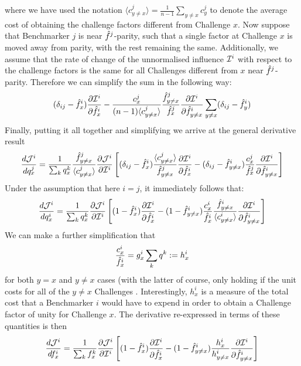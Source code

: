 where we have used the notation $\langle c^j_{y \neq x}\rangle = \frac{1}{n-1} \sum_{y \neq x} c^j_y$ to denote the average cost of obtaining the challenge factors different from Challenge $x$. 
Now suppose that Benchmarker $j$ is near $\hat{f}^j$-parity, such that a single factor at Challenge $x$ is moved away from parity, with the rest remaining the same. 
Additionally, we assume that the rate of change of the unnormalised influence $\mathcal{I}^i$ with respect to the challenge factors is the same for all Challenges different from $x$ near $\hat{f}^j$-parity.
Therefore we can simplify the sum in the following way:
\begin{equation}
	(\delta_{ij} - \hat{f}^i_x)\frac{\partial \mathcal{I}^i}{\partial \hat{f}^i_x} - \frac{c^j_x}{(n-1) \langle c^j_{y \neq x}\rangle} \frac{\hat{f}^j_{y \neq x}}{\hat{f}^j_x} \frac{\partial \mathcal{I}^i}{\partial \hat{f}^i_{y \neq x}} \sum_{y \neq x} (\delta_{ij} - \hat{f}^i_y)
\end{equation}
Finally, putting it all together and simplifying we arrive at the general derivative result
\begin{equation}
	\frac{d \mathcal{J}^i}{d q^j_x} = \frac{1}{\sum_k q^k_x} \frac{\hat{f}^j_{y \neq x}}{\langle c^j_{y \neq x}\rangle } \frac{\partial \mathcal{J}^i}{\partial \mathcal{I}^i}\left[(\delta_{ij} - \hat{f}^i_x) \frac{\langle c^j_{y \neq x} \rangle}{\hat{f}^j_{y \neq x}} \frac{\partial \mathcal{I}^i}{\partial \hat{f}^i_x} - (\delta_{ij} - \hat{f}^i_{y \neq x}) \frac{c^j_x}{\hat{f}^j_x} \frac{\partial \mathcal{I}^i}{\partial \hat{f}^i_{y \neq x}} \right]
\end{equation}
Under the assumption that here $i = j$, it immediately follows that:
\begin{equation}
	\frac{d \mathcal{J}^i}{d q^i_x} = \frac{1}{\sum_k q^k_x} \frac{\partial \mathcal{J}^i}{\partial \mathcal{I}^i}\left[(1 - \hat{f}^i_x) \frac{\partial \mathcal{I}^i}{\partial \hat{f}^i_x} - (1 - \hat{f}^i_{y \neq x}) \frac{c^i_x}{\hat{f}^i_x} \frac{\hat{f}^i_{y \neq x}}{\langle c^i_{y \neq x}\rangle } \frac{\partial \mathcal{I}^i}{\partial \hat{f}^i_{y \neq x}} \right]
\end{equation}
We can make a further simplification that
\begin{equation}
	\frac{c^i_x}{\hat{f}^i_x} = g^i_x \sum_k q^k := h^i_x	
\end{equation}
for both $y=x$ and $y\neq x$ cases (with the latter of course, only holding if the unit costs for all of the $y \neq x$ Challenges .
Interestingly, $h^i_x$ is a measure of the total cost that a Benchmarker $i$ would have to expend in order to obtain a Challenge factor of unity for Challenge $x$.
The derivative re-expressed in terms of these quantities is then
\begin{equation}
	\frac{d \mathcal{J}^i}{d f^i_x} = \frac{1}{\sum_k f^k_x} \frac{\partial \mathcal{J}^i}{\partial \mathcal{I}^i}\left[(1 - \hat{f}^i_x) \frac{\partial \mathcal{I}^i}{\partial \hat{f}^i_x} - (1 - \hat{f}^i_{y \neq x}) \frac{h^i_x}{h^i_{y \neq x}} \frac{\partial \mathcal{I}^i}{\partial \hat{f}^i_{y \neq x}} \right]
	\label{eq:appendix/final-influence-derivative}
\end{equation}

